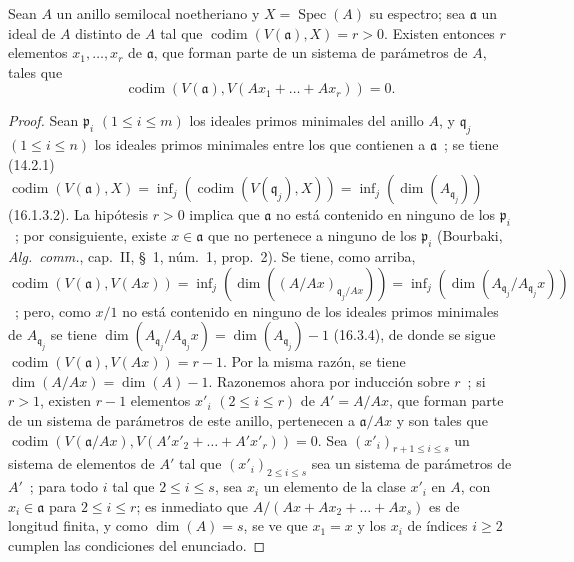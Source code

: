 
\begin{proposition}[16.3.8]
\label{0.16.3.8-fr}
Sean $A$ un anillo semilocal noetheriano y $X=\operatorname{Spec}(A)$ su
espectro; sea $\mathfrak{a}$ un ideal de $A$ distinto de $A$ tal que
$\operatorname{codim}(V(\mathfrak{a}),X)=r>0$. Existen entonces $r$ elementos
$x_1,\ldots,x_r$ de $\mathfrak{a}$, que forman parte de un sistema de parámetros
de $A$, tales que
\[
  \operatorname{codim}(V(\mathfrak{a}),
  V(Ax_1+\ldots+Ax_r))=0.
\]
\end{proposition}

\begin{proof}
Sean $\mathfrak{p}_i$ $(1\leq i\leq m)$ los ideales primos minimales del
anillo $A$, y $\mathfrak{q}_j$ $(1\leq i\leq n)$ los ideales primos minimales
entre los que contienen a $\mathfrak{a}$~; se tiene (14.2.1)
$\operatorname{codim}(V(\mathfrak{a}),X)=\inf_j(\operatorname{codim}(V(\mathfrak{q}_j),X))=\inf_j(\dim(A_{\mathfrak{q}_j}))$
(16.1.3.2). La hipótesis $r>0$ implica que $\mathfrak{a}$ no está contenido en
ninguno de los $\mathfrak{p}_i$~; por consiguiente, existe
$x\in\mathfrak{a}$ que no pertenece a ninguno de los $\mathfrak{p}_i$
(Bourbaki, \emph{Alg.~comm.}, cap.~II, \S~1, núm.~1, prop.~2). Se tiene, como
arriba,
$\operatorname{codim}(V(\mathfrak{a}),V(Ax))=\inf_j(\dim((A/Ax)_{\mathfrak{q}_j/Ax}))=\inf_j(\dim(A_{\mathfrak{q}_j}/A_{\mathfrak{q}_j}x))$~;
pero, como $x/1$ no está contenido en ninguno de los ideales primos minimales
de $A_{\mathfrak{q}_j}$ se tiene
$\dim(A_{\mathfrak{q}_j}/A_{\mathfrak{q}_j}x)
=\dim(A_{\mathfrak{q}_j})-1$ (16.3.4), de donde se sigue
$\operatorname{codim}(V(\mathfrak{a}),V(Ax))=r-1$. Por la misma razón, se tiene
$\dim(A/Ax)=\dim(A)-1$. Razonemos ahora por inducción sobre $r$~; si
$r>1$, existen $r-1$ elementos $x'_i$ $(2\leq i\leq r)$ de $A'=A/Ax$,
que forman parte de un sistema de parámetros de este anillo, pertenecen a
$\mathfrak{a}/Ax$ y son tales que
$\operatorname{codim}(V(\mathfrak{a}/Ax),V(A'x'_2+\ldots+A'x'_r))=0$.
Sea $(x'_i)_{r+1\leq i\leq s}$ un sistema de elementos de $A'$ tal que
$(x'_i)_{2\leq i\leq s}$ sea un sistema de parámetros de $A'$~; para todo
$i$ tal que $2\leq i\leq s$, sea $x_i$ un elemento de la clase $x'_i$ en
$A$, con $x_i\in\mathfrak{a}$ para $2\leq i\leq r$; es inmediato que
$A/(Ax+Ax_2+\ldots+Ax_s)$ es de longitud finita, y como $\dim(A)=s$, se ve
que $x_1=x$ y los $x_i$ de índices $i\geq2$ cumplen las condiciones del
enunciado.
\end{proof}


